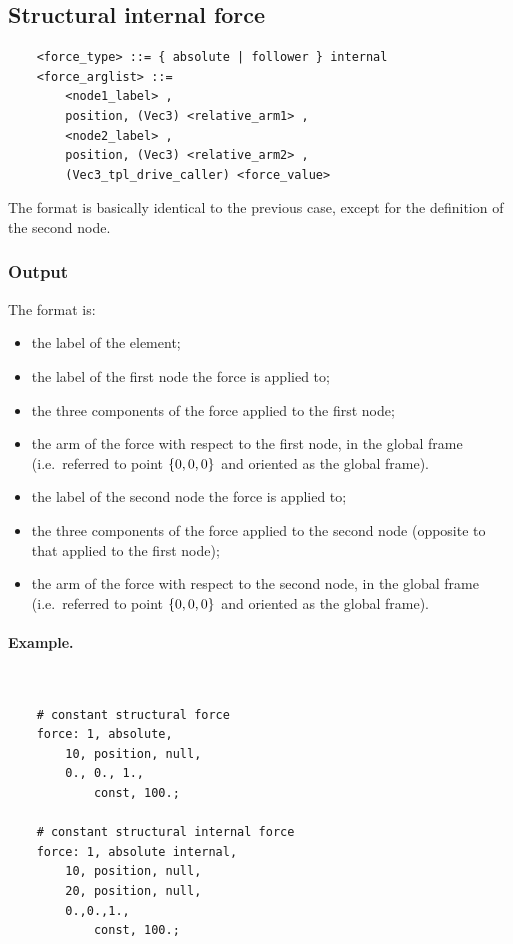 \subsection{Structural internal force}
\begin{verbatim}
    <force_type> ::= { absolute | follower } internal
    <force_arglist> ::=
        <node1_label> , 
        position, (Vec3) <relative_arm1> ,
        <node2_label> ,
        position, (Vec3) <relative_arm2> ,
        (Vec3_tpl_drive_caller) <force_value>
\end{verbatim}
The format is basically identical to the previous case,
except for the definition of the second node.

\subsubsection{Output}
The format is:
\begin{itemize}
    \item the label of the element;
    \item the label of the first node the force is applied to;
    \item the three components of the force applied to the first node;
    \item the arm of the force with respect to the first node,
	  in the global frame (i.e.\ referred to point $ \left\{ 0,0,0 \right\} $
	  and oriented as the global frame).
    \item the label of the second node the force is applied to;
    \item the three components of the force applied to the second node
	  (opposite to that applied to the first node);
    \item the arm of the force with respect to the second node,
	  in the global frame (i.e.\ referred to point $ \left\{ 0,0,0 \right\} $
	  and oriented as the global frame).
\end{itemize}

\paragraph{Example.} \
\begin{verbatim}
    # constant structural force
    force: 1, absolute,
        10, position, null,
        0., 0., 1.,
            const, 100.;

    # constant structural internal force
    force: 1, absolute internal,
        10, position, null,
        20, position, null,
        0.,0.,1.,
            const, 100.;
\end{verbatim}


